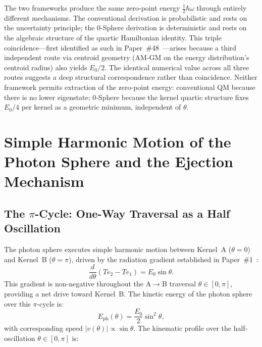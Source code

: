 \documentclass[%
 reprint, amsmath,amssymb, aps, prb, ]{revtex4-2}
\numberwithin{equation}{section}
\newcommand{\iphase}{\theta}
\begin{document}
\begin{table}[t!]
\begin{minipage}{0.95\textwidth}
The two frameworks produce the same zero-point energy $\tfrac{1}{2}\hbar\omega$ through entirely different mechanisms. The conventional derivation is probabilistic and rests on the uncertainty principle; the 0-Sphere derivation is deterministic and rests on the algebraic structure of the quartic Hamiltonian identity. This triple coincidence---first identified as such in Paper~\#48~\cite{hanamura48}---arises because a third independent route via centroid geometry (AM-GM on the energy distribution's centroid radius) also yields $E_0/2$. The identical numerical value across all three routes suggests a deep structural correspondence rather than coincidence. Neither framework permits extraction of the zero-point energy: conventional QM because there is no lower eigenstate; 0-Sphere because the kernel quartic structure fixes $E_0/4$ per kernel as a geometric minimum, independent of $\theta$.
\end{minipage}
\end{table}

\section{Simple Harmonic Motion of the Photon Sphere and the Ejection Mechanism}
\label{sec:ejection}

\subsection{The $\pi$-Cycle: One-Way Traversal as a Half Oscillation}
\label{sec:ejection_shm}

The photon sphere executes simple harmonic motion between Kernel~A ($\theta = 0$) and Kernel~B ($\theta = \pi$), driven by the radiation gradient established in Paper~\#1~\cite{hanamura01}:
\begin{equation}
\frac{d}{d\iphase}(Te_2 - Te_1) = E_0\sin\iphase.
\label{eq:radiation_gradient}
\end{equation}
This gradient is non-negative throughout the A$\to$B traversal $\iphase \in [0, \pi]$, providing a net drive toward Kernel~B. The kinetic energy of the photon sphere over this $\pi$-cycle is:
\begin{equation}
E_{\text{ph}}(\iphase) = \frac{E_0}{2}\sin^2\!\iphase,
\label{eq:Eph_profile}
\end{equation}
with corresponding speed $|v(\iphase)| \propto \sin\iphase$. The kinematic profile over the half-oscillation $\iphase \in [0, \pi]$ is:
\end{document}
